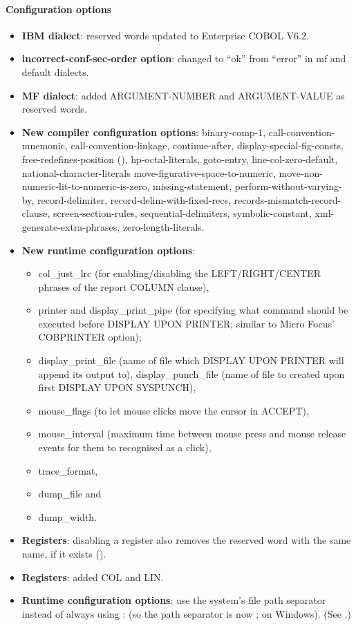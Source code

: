 \paragraph{Configuration options}
\begin{itemize}
\item \textbf{IBM dialect}: reserved words updated to Enterprise COBOL V6.2.
\item \textbf{incorrect-conf-sec-order option}: changed to ``ok'' from ``error'' in mf and default dialects.
\item \textbf{MF dialect}: added ARGUMENT-NUMBER and ARGUMENT-VALUE as reserved words.
\item \textbf{New compiler configuration options}: binary-comp-1, call-convention-mnemonic, call-convention-linkage, continue-after, display-special-fig-consts, free-redefines-position (), hp-octal-literals, goto-entry, line-col-zero-default, national-character-literals move-figurative-space-to-numeric, move-non-numeric-lit-to-numeric-is-zero, missing-statement, perform-without-varying-by, record-delimiter, record-delim-with-fixed-recs, records-mismatch-record-clause, screen-section-rules, sequential-delimiters, symbolic-constant, xml-generate-extra-phrases, zero-length-literals.
\item \textbf{New runtime configuration options}:
  \begin{itemize}
  \item col\_just\_lrc (for enabling\slash{}disabling the LEFT\slash{}RIGHT\slash{}CENTER phrases of the report COLUMN clause),
  \item printer and display\_print\_pipe (for specifying what command should be executed before DISPLAY UPON PRINTER; similar to Micro Focus' COBPRINTER option);
  \item display\_print\_file (name of file which DISPLAY UPON PRINTER will append its output to), display\_punch\_file (name of file to created upon first DISPLAY UPON SYSPUNCH),
  \item mouse\_flags (to let mouse clicks move the cursor in ACCEPT),
  \item mouse\_interval (maximum time between mouse press and mouse release events for them to recognised as a click),
  \item trace\_format,
  \item dump\_file and
  \item dump\_width.
  \end{itemize}
\item \textbf{Registers}: disabling a register also removes the reserved word with the same name, if it exists ().
\item \textbf{Registers}: added COL and LIN.
\item \textbf{Runtime configuration options}: use the system's file path separator instead of always using : (so the path separator is now ; on Windows). (See .)
\end{itemize}

